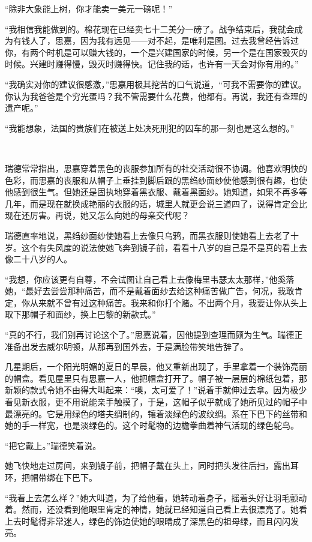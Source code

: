 \par “除非大象能上树，你才能卖一美元一磅呢！”
\par “我相信我能做到的。棉花现在已经卖七十二美分一磅了。战争结束后，我就会成为有钱人了，思嘉，因为我有远见——对不起，是唯利是图。过去我曾经告诉过你，有两个时机是可以赚大钱的，一个是兴建国家的时候，另一个是在国家毁灭的时候。兴建时赚得慢，毁灭时赚得快。记住我的话，也许有一天会对你有用的。”
\par “我确实对你的建议很感激，”思嘉用极其挖苦的口气说道，“可我不需要你的建议。你认为我爸爸是个穷光蛋吗？我不管需要什么花费，他都有。再说，我还有查理的遗产呢。”
\par “我能想象，法国的贵族们在被送上处决死刑犯的囚车的那一刻也是这么想的。”
\par  
\par 瑞德常常指出，思嘉穿着黑色的丧服参加所有的社交活动很不协调。他喜欢明快的色彩，而思嘉的丧服和从帽子上垂挂到脚后跟的黑绉纱面纱使他感到很有趣，也使他感到很生气。但她还是固执地穿着黑衣服、戴着黑面纱。她知道，如果不再多等几年，而是现在就换成艳丽的衣服的话，城里人就更会说三道四了，说得肯定会比现在还厉害。再说，她又怎么向她的母亲交代呢？
\par 瑞德直率地说，黑绉纱面纱使她看上去像只乌鸦，而黑衣服则使她看上去老了十岁。这个有失风度的说法使她飞奔到镜子前，看看十八岁的自己是不是真的看上去像二十八岁的人。
\par “我想，你应该更有自尊，不会试图让自己看上去像梅里韦瑟太太那样，”他奚落她，“最好去尝尝那种痛苦，而不是戴着面纱去给这种痛苦做广告，何况，我敢肯定，你从来就不曾有过这种痛苦。我来和你打个赌。不出两个月，我要让你从头上取下那帽子和面纱，换上巴黎的新款式。”
\par “真的不行，我们别再讨论这个了。”思嘉说着，因他提到查理而颇为生气。瑞德正准备出发去威尔明顿，从那再到国外去，于是满脸带笑地告辞了。
\par 几星期后，一个阳光明媚的夏日的早晨，他又重新出现了，手里拿着一个装饰亮丽的帽盒。看见屋里只有思嘉一人，他把帽盒打开了。帽子被一层层的棉纸包着，那新颖的款式令她不由得大叫起来：“噢，太可爱了！”说着手就伸过去拿。因为极少看见新衣服，更不用说能亲手触摸了，于是，这帽子似乎就成了她所见过的帽子中最漂亮的。它是用绿色的塔夫绸制的，镶着淡绿色的波纹绸。系在下巴下的丝带和她的手一样宽，也是淡绿色的。这个时髦物的边檐拳曲着神气活现的绿色鸵鸟。
\par “把它戴上。”瑞德笑着说。
\par 她飞快地走过房间，来到镜子前，把帽子戴在头上，同时把头发往后扫，露出耳环，把帽带绑在下巴下。
\par “我看上去怎么样？”她大叫道，为了给他看，她转动着身子，摇着头好让羽毛颤动着。然而，还没看到他眼里肯定的神情，她就已经知道自己看上去很漂亮了。她看上去时髦得非常迷人，绿色的饰边使她的眼睛成了深黑色的祖母绿，而且闪闪发亮。
